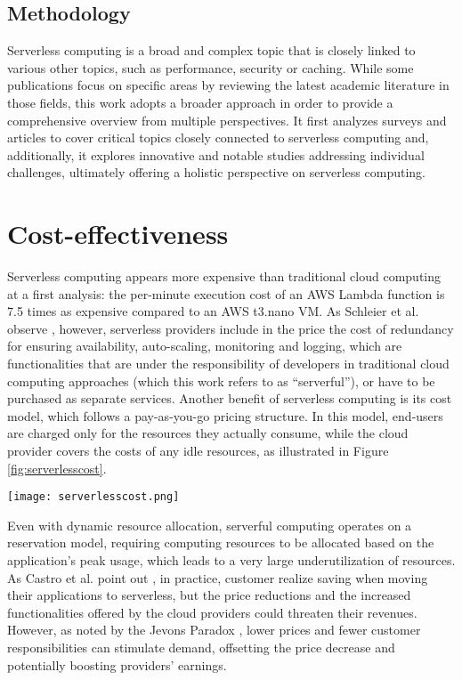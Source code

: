 \documentclass[
	a4paper, %
	12pt,
	twoside, %
]{LTJournalArticle}
\begin{document}
\subsection{Methodology}
Serverless computing is a broad and complex topic that is closely linked to various other topics, such as performance, security or caching. While some publications focus on specific areas by reviewing the latest academic literature in those fields, this work adopts a broader approach in order to provide a comprehensive overview from multiple perspectives. It first analyzes surveys and articles to cover critical topics closely connected to serverless computing and, additionally, it explores innovative and notable studies addressing individual challenges, ultimately offering a holistic perspective on serverless computing.

\section{Cost-effectiveness}
\label{sec:costeffectiveness}
Serverless computing appears more expensive than traditional cloud computing at a first analysis: the per-minute execution cost of an AWS Lambda function is 7.5 times as expensive compared to an AWS t3.nano VM. As Schleier et al. observe \cite{schleier-smith_what_2021}, however, serverless providers include in the price the cost of redundancy for ensuring availability, auto-scaling, monitoring and logging, which are functionalities that are under the responsibility of developers in traditional cloud computing approaches (which this work refers to as ``serverful''), or have to be purchased as separate services.
Another benefit of serverless computing is its cost model, which follows a pay-as-you-go pricing structure. In this model, end-users are charged only for the resources they actually consume, while the cloud provider covers the costs of any idle resources, as illustrated in Figure \ref{fig:serverlesscost}.
\begin{figure*}
	\texttt{[image: serverlesscost.png]}
	\caption{Advantages of serverless computing's cost model. Source: \cite{schleier-smith_what_2021}}
	\label{fig:serverlesscost}
\end{figure*}
Even with dynamic resource allocation, serverful computing operates on a reservation model, requiring computing resources to be allocated based on the application's peak usage, which leads to a very large underutilization of resources. As Castro et al. point out \cite{schleier-smith_what_2021}, in practice, customer realize saving when moving their applications to serverless, but the price reductions and the increased functionalities offered by the cloud providers could threaten their revenues. 
However, as noted by the Jevons Paradox \cite{alcott_jevons_2005}, lower prices and fewer customer responsibilities can stimulate demand, offsetting the price decrease and potentially boosting providers’ earnings. 
\end{document}
